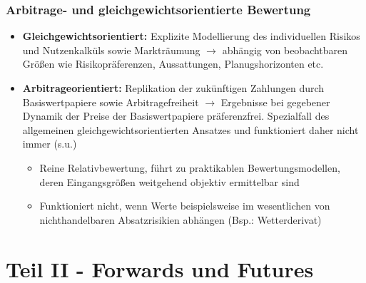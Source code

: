 \subsubsection{Arbitrage- und gleichgewichtsorientierte Bewertung}
\begin{itemize}
	\item \textbf{Gleichgewichtsorientiert:} Explizite Modellierung des individuellen Risikos und Nutzenkalküls sowie Markträumung \(\rightarrow\) abhängig von beobachtbaren Größen wie Risikopräferenzen, Aussattungen, Planugshorizonten etc.
	\item \textbf{Arbitrageorientiert:} Replikation der zukünftigen Zahlungen durch Basiswertpapiere sowie Arbitragefreiheit \(\rightarrow\) Ergebnisse bei gegebener Dynamik der Preise der Basiswertpapiere präferenzfrei. Spezialfall des allgemeinen gleichgewichtsorientierten Ansatzes und funktioniert daher nicht immer (s.u.)
	\begin{itemize}
		\item Reine Relativbewertung, führt zu praktikablen Bewertungsmodellen, deren Eingangsgrößen weitgehend objektiv ermittelbar sind
		\item Funktioniert nicht, wenn Werte beispielsweise im wesentlichen von nichthandelbaren Absatzrisikien abhängen (Bsp.: Wetterderivat)
	\end{itemize}
\end{itemize}



\section{Teil II - Forwards und Futures}

